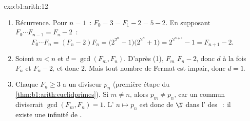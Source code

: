 \begin{solution}{exo:b1:arith:12}
\begin{enumerate}
  \item Récurrence. Pour $n = 1$~: $F_0 = 3 = F_1 - 2 = 5 - 2$.
        En supposant $F_0\cdots F_{n-1} = F_n - 2$~:
        \[
        F_0 \cdots F_n = (F_n - 2)F_n
        = \bigl(2^{2^n} - 1\bigr)\bigl(2^{2^n} + 1\bigr)
        = 2^{2^{n+1}} - 1 = F_{n+1} - 2 .
        \]
  \item Soient $m < n$ et $d = \gcd(F_m, F_n)$. D'après (1), $F_m$
         $F_n - 2$, donc $d$  à la fois $F_n$ et $F_n -
        2$, et  donc $2$. Mais tout nombre de Fermat est impair, donc
        $d = 1$.
  \item Chaque $F_n \geq 3$ a un diviseur  $p_n$
        (première étape du \cref{thm:b1:arith:euclidprimes}). Si $m
        \neq n$, alors $p_m \neq p_n$, car un  commun
        diviserait $\gcd(F_m, F_n) = 1$. L' $n \mapsto p_n$ est
        donc  de $\N$ dans l' des ~: il existe une
        infinité de .
\end{enumerate}
\end{solution}

